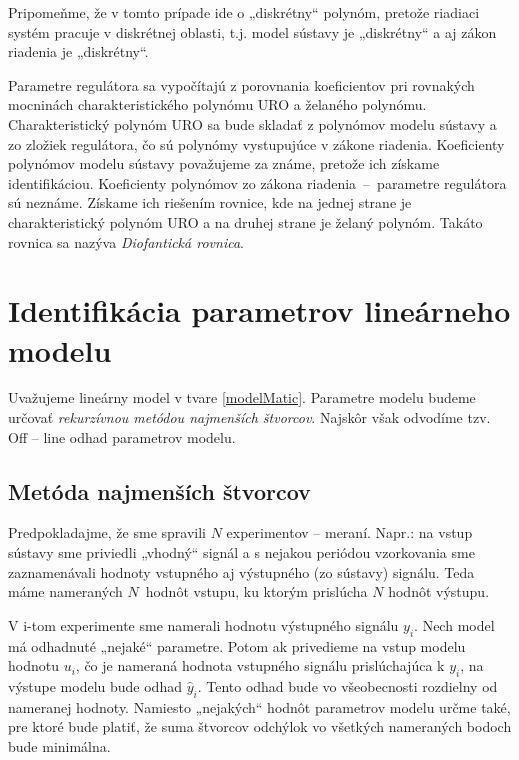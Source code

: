 \documentclass[a4paper, 10pt, ]{article}
\begin{document}
Pripomeňme, že v tomto prípade ide o „diskrétny“ polynóm, pretože riadiaci systém pracuje v diskrétnej oblasti, t.j. model sústavy je „diskrétny“ a aj zákon riadenia je „diskrétny“.

Parametre regulátora sa vypočítajú z porovnania koeficientov pri rovnakých mocninách charakteristického polynómu URO a želaného polynómu. Charakteristický polynóm URO sa bude skladať z polynómov modelu sústavy a zo zložiek regulátora, čo sú polynómy vystupujúce v zákone riadenia. Koeficienty polynómov modelu sústavy považujeme za známe, pretože ich získame identifikáciou. Koeficienty polynómov zo zákona riadenia~--~parametre regulátora sú neznáme. Získame ich riešením rovnice, kde na jednej strane je charakteristický polynóm URO a na druhej strane je želaný polynóm. Takáto rovnica sa nazýva \emph{Diofantická rovnica}.








\section{Identifikácia parametrov lineárneho modelu}


Uvažujeme lineárny model v tvare \eqref{modelMatic}. Parametre modelu budeme určovať \emph{rekurzívnou metódou najmenších štvorcov}. Najskôr však odvodíme tzv. Off -- line odhad parametrov modelu.






\subsection{Metóda najmenších štvorcov}
Predpokladajme, že sme spravili $N$ experimentov -- meraní. Napr.: na vstup sústavy sme priviedli „vhodný“ signál a s nejakou periódou vzorkovania sme zaznamenávali hodnoty vstupného aj výstupného (zo sústavy) signálu. Teda máme nameraných $N$~hodnôt vstupu, ku ktorým prislúcha $N$ hodnôt výstupu.

V i-tom experimente sme namerali hodnotu výstupného signálu $y_i$. Nech model má odhadnuté „nejaké“ parametre. Potom ak privedieme na vstup modelu hodnotu $u_i$, čo je nameraná hodnota vstupného signálu prislúchajúca k $y_i$, na výstupe modelu bude odhad $\hat{y}_i$. Tento odhad bude vo všeobecnosti rozdielny od nameranej hodnoty. Namiesto „nejakých“ hodnôt parametrov modelu určme také, pre ktoré bude platiť, že suma štvorcov odchýlok vo všetkých nameraných bodoch bude minimálna.
\end{document}
